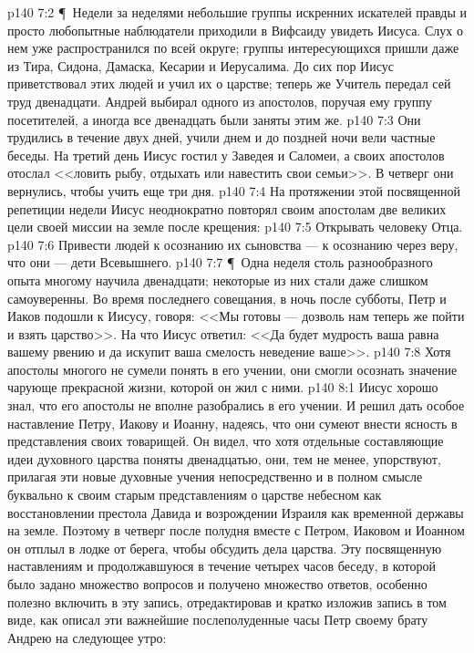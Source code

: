 \vs p140 7:2 \P\ Недели за неделями небольшие группы искренних искателей правды и просто любопытные наблюдатели приходили в Вифсаиду увидеть Иисуса. Слух о нем уже распространился по всей округе; группы интересующихся пришли даже из Тира, Сидона, Дамаска, Кесарии и Иерусалима. До сих пор Иисус приветствовал этих людей и учил их о царстве; теперь же Учитель передал сей труд двенадцати. Андрей выбирал одного из апостолов, поручая ему группу посетителей, а иногда все двенадцать были заняты этим же.
\vs p140 7:3 Они трудились в течение двух дней, учили днем и до поздней ночи вели частные беседы. На третий день Иисус гостил у Заведея и Саломеи, а своих апостолов отослал <<ловить рыбу, отдыхать или навестить свои семьи>>. В четверг они вернулись, чтобы учить еще три дня.
\vs p140 7:4 На протяжении этой посвященной репетиции недели Иисус неоднократно повторял своим апостолам две великих цели своей миссии на земле после крещения:
\vs p140 7:5 \bibnobreakspace Открывать человеку Отца.
\vs p140 7:6 \bibnobreakspace Привести людей к осознанию их сыновства --- к осознанию через веру, что они --- дети Всевышнего.
\vs p140 7:7 \P\ Одна неделя столь разнообразного опыта многому научила двенадцати; некоторые из них стали даже слишком самоуверенны. Во время последнего совещания, в ночь после субботы, Петр и Иаков подошли к Иисусу, говоря: <<Мы готовы --- дозволь нам теперь же пойти и взять царство>>. На что Иисус ответил: <<Да будет мудрость ваша равна вашему рвению и да искупит ваша смелость неведение ваше>>.
\vs p140 7:8 Хотя апостолы многого не сумели понять в его учении, они смогли осознать значение чарующе прекрасной жизни, которой он жил с ними.
\vs p140 8:1 Иисус хорошо знал, что его апостолы не вполне разобрались в его учении. И решил дать особое наставление Петру, Иакову и Иоанну, надеясь, что они сумеют внести ясность в представления своих товарищей. Он видел, что хотя отдельные составляющие идеи духовного царства поняты двенадцатью, они, тем не менее, упорствуют, прилагая эти новые духовные учения непосредственно и в полном смысле буквально к своим старым представлениям о царстве небесном как восстановлении престола Давида и возрождении Израиля как временной державы на земле. Поэтому в четверг после полудня вместе с Петром, Иаковом и Иоанном он отплыл в лодке от берега, чтобы обсудить дела царства. Эту посвященную наставлениям и продолжавшуюся в течение четырех часов беседу, в которой было задано множество вопросов и получено множество ответов, особенно полезно включить в эту запись, отредактировав и кратко изложив запись в том виде, как описал эти важнейшие послеполуденные часы Петр своему брату Андрею на следующее утро:
